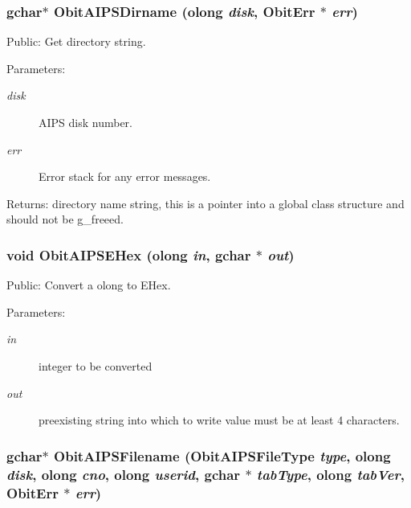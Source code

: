 \subsubsection{\setlength{\rightskip}{0pt plus 5cm}gchar$\ast$ Obit\-AIPSDirname ({\bf olong} {\em disk}, {\bf Obit\-Err} $\ast$ {\em err})}\label{ObitAIPS_8h_a16}


Public: Get directory string. 

\begin{Desc}
\item[Parameters:]
\begin{description}
\item[{\em disk}]AIPS disk number. \item[{\em err}]Error stack for any error messages. \end{description}
\end{Desc}
\begin{Desc}
\item[Returns:]directory name string, this is a pointer into a global class structure and should not be g\_\-freeed. \end{Desc}
\subsubsection{\setlength{\rightskip}{0pt plus 5cm}void Obit\-AIPSEHex ({\bf olong} {\em in}, gchar $\ast$ {\em out})}\label{ObitAIPS_8h_a22}


Public: Convert a olong to EHex. 

\begin{Desc}
\item[Parameters:]
\begin{description}
\item[{\em in}]integer to be converted \item[{\em out}]preexisting string into which to write value must be at least 4 characters. \end{description}
\end{Desc}
\subsubsection{\setlength{\rightskip}{0pt plus 5cm}gchar$\ast$ Obit\-AIPSFilename (Obit\-AIPSFile\-Type {\em type}, {\bf olong} {\em disk}, {\bf olong} {\em cno}, {\bf olong} {\em userid}, gchar $\ast$ {\em tab\-Type}, {\bf olong} {\em tab\-Ver}, {\bf Obit\-Err} $\ast$ {\em err})}\label{ObitAIPS_8h_a13}


